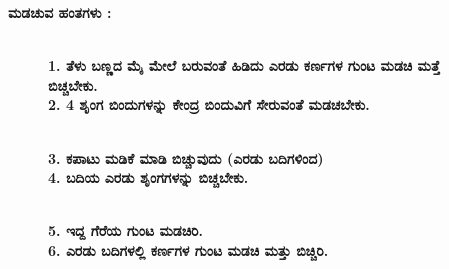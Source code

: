 \noindent
\textbf{ಮಡಚುವ ಹಂತಗಳು :}
\begin{figure}[H]
\\
\textbf{1. ತೆಳು ಬಣ್ಣದ ಮೈ ಮೇಲೆ ಬರುವಂತೆ ಹಿಡಿದು ಎರಡು ಕರ್ಣಗಳ ಗುಂಟ ಮಡಚಿ ಮತ್ತೆ ಬಿಚ್ಚಬೇಕು.}\\
\textbf{2. 4 ಶೃಂಗ ಬಿಂದುಗಳನ್ನು ಕೇಂದ್ರ ಬಿಂದುವಿಗೆ ಸೇರುವಂತೆ ಮಡಚಬೇಕು.}
\end{figure}
\begin{figure}[H]
\\
\textbf{3. ಕಪಾಟು ಮಡಿಕೆ ಮಾಡಿ ಬಿಚ್ಚುವುದು (ಎರಡು ಬದಿಗಳಿಂದ)}\\
\textbf{4. ಬದಿಯ ಎರಡು ಶೃಂಗಗಳನ್ನು ಬಿಚ್ಚಬೇಕು.}
\end{figure}
\begin{figure}[H]
\\
\textbf{5. ಇದ್ದ ಗೆರೆಯ ಗುಂಟ ಮಡಚಿರಿ.}\\
\textbf{6. ಎರಡು ಬದಿಗಳಲ್ಲಿ ಕರ್ಣಗಳ ಗುಂಟ ಮಡಚಿ ಮತ್ತು ಬಿಚ್ಚಿರಿ.}
\end{figure}
